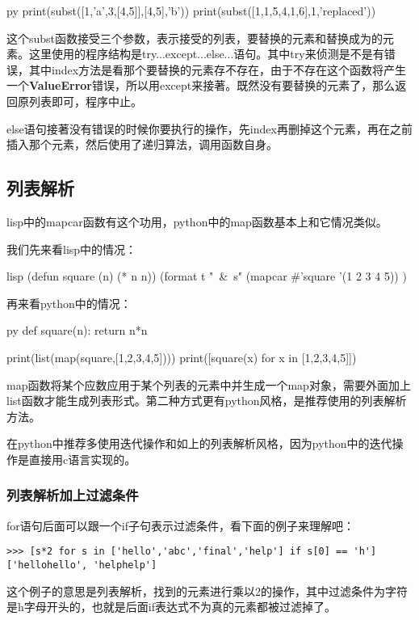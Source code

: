 \documentclass[12pt,oneside]{book}
\begin{document}
\begin{common-format}
\begin{xverbatim}[129]{py}
print(subst([1,'a',3,[4,5]],[4,5],'b'))
print(subst([1,1,5,4,1,6],1,'replaced'))
\end{xverbatim}
这个subst函数接受三个参数，表示接受的列表，要替换的元素和替换成为的元素。这里使用的程序结构是try...except...else...语句。其中try来侦测是不是有错误，其中index方法是看那个要替换的元素存不存在，由于不存在这个函数将产生一个\textbf{ValueError}错误，所以用except来接著。既然没有要替换的元素了，那么返回原列表即可，程序中止。

else语句接著没有错误的时候你要执行的操作，先index再删掉这个元素，再在之前插入那个元素，然后使用了递归算法，调用函数自身。

\subsection{列表解析}
\label{sec:列表解析}
lisp中的mapcar函数有这个功用，python中的map函数基本上和它情况类似。

我们先来看lisp中的情况：
\begin{xverbatim}[129]{lisp}
(defun square (n) (* n n))
(format t "~&~s" (mapcar #'square '(1 2 3 4 5)) )
\end{xverbatim}

再来看python中的情况：
\begin{xverbatim}[129]{py}
def square(n):
    return n*n
    
print(list(map(square,[1,2,3,4,5])))
print([square(x) for x in [1,2,3,4,5]])
\end{xverbatim}
map函数将某个应数应用于某个列表的元素中并生成一个map对象，需要外面加上list函数才能生成列表形式。第二种方式更有python风格，是推荐使用的列表解析方法。

在python中推荐多使用迭代操作和如上的列表解析风格，因为python中的迭代操作是直接用c语言实现的。

\subsubsection{列表解析加上过滤条件}
for语句后面可以跟一个if子句表示过滤条件，看下面的例子来理解吧：
\begin{Verbatim}
>>> [s*2 for s in ['hello','abc','final','help'] if s[0] == 'h']
['hellohello', 'helphelp']
\end{Verbatim}

这个例子的意思是列表解析，找到的元素进行乘以2的操作，其中过滤条件为字符是h字母开头的，也就是后面if表达式不为真的元素都被过滤掉了。


\end{common-format}
\end{document}
